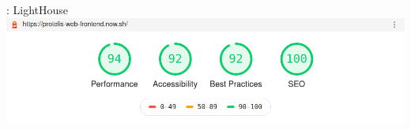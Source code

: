     \begin{frame}{\insertsectionhead}{\insertsubsectionhead{}: LightHouse}
      \centering
      \includegraphics[width=.9\textwidth]{../res/tests/Screenshot_2020-03-04 Lighthouse Report Viewer.png}
    \end{frame}

